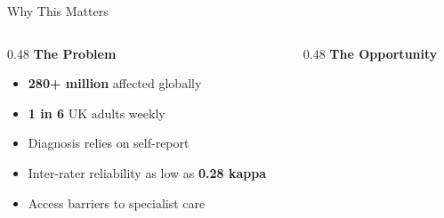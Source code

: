 \documentclass[aspectratio=169,11pt]{beamer}
\begin{document}
\begin{frame}{Why This Matters}
    \begin{columns}[T]
        \begin{column}{0.48\textwidth}
            \textbf{\color{uofgblue}\faExclamationTriangle\hspace{0.3em} The Problem}
            
            \vspace{0.3cm}
            
            \begin{itemize}
                \item \textbf{280+ million} affected globally
                \item \textbf{1 in 6} UK adults weekly
                \item Diagnosis relies on self-report
                \item Inter-rater reliability as low as \textbf{0.28 kappa}
                \item Access barriers to specialist care
            \end{itemize}
        \end{column}
        
        \begin{column}{0.48\textwidth}
            \textbf{\color{successgreen}\faLightbulb\hspace{0.3em} The Opportunity}
            
            \vspace{0.3cm}
            
            \begin{center}
            \end{center}
        \end{column}
    \end{columns}
\end{frame}
\end{document}
